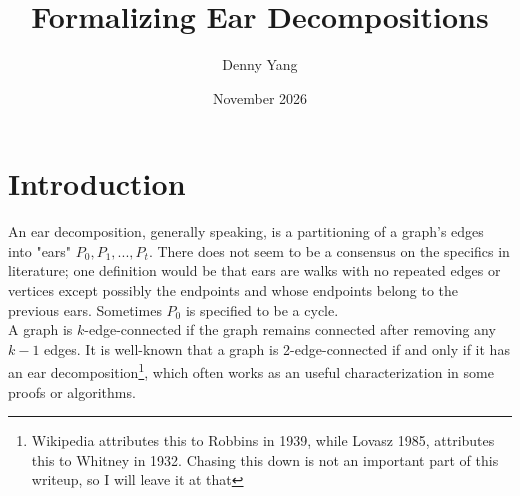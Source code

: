 \documentclass{article}
\title{Formalizing Ear Decompositions}
\author{Denny Yang}
\date{November 2026}
\begin{document}
\maketitle

\section{Introduction}
An ear decomposition, generally speaking, is a partitioning of a graph's edges into "ears" $P_0,P_1,..., P_t$. There does not seem to be a consensus on the specifics in literature; one definition would be that ears are walks with no repeated edges or vertices except possibly the endpoints and whose endpoints belong to the previous ears. Sometimes $P_0$ is specified to be a cycle.
\\ A graph is $k$-edge-connected if the graph remains connected after removing any $k-1$ edges. It is well-known that a graph is 2-edge-connected if and only if it has an ear decomposition\footnote{Wikipedia attributes this to Robbins in 1939, while Lovasz 1985, attributes this to Whitney in 1932. Chasing this down is not an important part of this writeup, so I will leave it at that}, which often works as an useful characterization in some proofs or algorithms.
\end{document}
